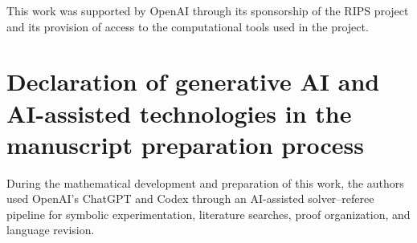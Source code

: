 \documentclass[11pt]{amsart}
\theoremstyle{definition}
\theoremstyle{remark}
\begin{document}
This work was supported by OpenAI through its sponsorship of the RIPS project
and its provision of access to the computational tools used in the project.

\section*{Declaration of generative AI and AI-assisted technologies in the
manuscript preparation process}

During the mathematical development and preparation of this work, the authors
used OpenAI's ChatGPT and Codex through an AI-assisted solver--referee pipeline
for symbolic experimentation, literature searches, proof organization, and
language revision.



\end{document}
